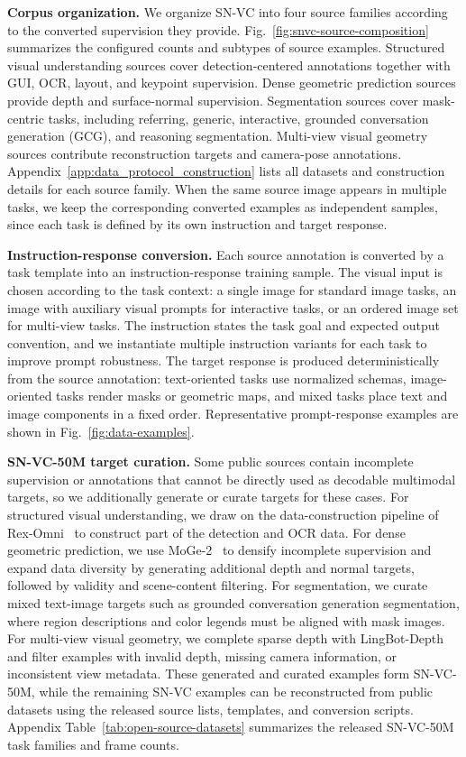 \textbf{Corpus organization.}
We organize SN-VC into four source families according to the converted supervision they provide.
Fig.~\ref{fig:snvc-source-composition} summarizes the configured counts and subtypes of source examples.
Structured visual understanding sources cover detection-centered annotations together with GUI, OCR, layout, and keypoint supervision.
Dense geometric prediction sources provide depth and surface-normal supervision.
Segmentation sources cover mask-centric tasks, including referring, generic, interactive, grounded conversation generation (GCG), and reasoning segmentation.
Multi-view visual geometry sources contribute reconstruction targets and camera-pose annotations.
Appendix~\ref{app:data_protocol_construction} lists all datasets and construction details for each source family.
When the same source image appears in multiple tasks, we keep the corresponding converted examples as independent samples, since each task is defined by its own instruction and target response.

\textbf{Instruction-response conversion.}
Each source annotation is converted by a task template into an instruction-response training sample.
The visual input is chosen according to the task context: a single image for standard image tasks, an image with auxiliary visual prompts for interactive tasks, or an ordered image set for multi-view tasks.
The instruction states the task goal and expected output convention, and we instantiate multiple instruction variants for each task to improve prompt robustness.
The target response is produced deterministically from the source annotation: text-oriented tasks use normalized schemas, image-oriented tasks render masks or geometric maps, and mixed tasks place text and image components in a fixed order.
Representative prompt-response examples are shown in Fig.~\ref{fig:data-examples}.

\textbf{SN-VC-50M target curation.}
Some public sources contain incomplete supervision or annotations that cannot be directly used as decodable multimodal targets, so we additionally generate or curate targets for these cases.
For structured visual understanding, we draw on the data-construction pipeline of Rex-Omni~\cite{rexomni} to construct part of the detection and OCR data.
For dense geometric prediction, we use MoGe-2~\cite{wang2025moge2} to densify incomplete supervision and expand data diversity by generating additional depth and normal targets, followed by validity and scene-content filtering.
For segmentation, we curate mixed text-image targets such as grounded conversation generation segmentation, where region descriptions and color legends must be aligned with mask images.
For multi-view visual geometry, we complete sparse depth with LingBot-Depth~\cite{lingbotdepth} and filter examples with invalid depth, missing camera information, or inconsistent view metadata.
These generated and curated examples form SN-VC-50M, while the remaining SN-VC examples can be reconstructed from public datasets using the released source lists, templates, and conversion scripts.
Appendix Table~\ref{tab:open-source-datasets} summarizes the released SN-VC-50M task families and frame counts.

